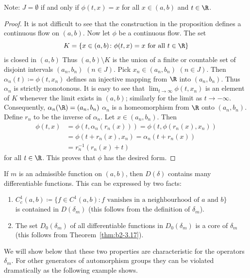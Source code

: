 Note: $J = \emptyset$ if and only if\/ $\phi(t,x) = x$ for all $x \in (a,b)$ and $t \in \R$.
\begin{proof}
It is not difficult to see that the construction in the proposition defines a continuous flow on $(a,b)$.
Now let $\phi$ be a continuous flow.
The set 
\[
K = \{ x \in (a,b) \colon \phi(t,x) = x \text{ for all } t \in \R \} 
\]
is closed in $(a,b)$
Thus $(a,b) \setminus K$ is the union of a finite or countable set of disjoint intervals $(a_{n},b_{n})$ $(n \in J)$.
Pick $x_{n} \in (a_{n},b_{n})$ $(n \in J)$.
Then $\alpha_{n}(t) \coloneq \phi(t,x_{n})$ defines an injective mapping from $\R$ into $(a_{n},b_{n})$.
Thus $\alpha_{n}$ is strictly monotonous.
It is easy to see that $\lim_{t \to \infty} \phi(t,x_{n})$ is an element of\/ $K$ whenever the limit exists in $(a,b)$; similarly for the limit as $t \to -\infty$.
Consequently, $\alpha_{n}(\R) = (a_{n},b_{n})$ \ie  $\alpha_{n}$ is a homeomorphism from $\R$ onto $(a_{n},b_{n})$.
Define $r_{n}$ to be the inverse of\/ $\alpha_{n}$.
Let $x \in (a_{n},b_{n})$.
Then 
\begin{align*}
\phi(t,x) &= \phi(t, \alpha_{n}(r_{n}(x))) = \phi(t, \phi(r_{n}(x),x_{n})) \\
          &= \phi(t + r_{n}(x),x_{n}) = \alpha_{n}(t + r_{n}(x)) \\
          &= r_{n}^{-1}(r_{n}(x) + t)	
\end{align*}
for all $t \in \R$.
This proves that $\phi$ has the desired form.
\end{proof}
If\/ $m$ is an admissible function on $(a,b)$, then $D(\delta)$ contains many differentiable functions.
This can be expressed by two facts:
\begin{enumerate}[\upshape (i)]
\item \label{enum:b2-3-1.1}
$C_{c}^{1}(a,b) \coloneq \{ f \in C^{1}(a,b) \colon f \text{ vanishes in a neighbourhood of } a \text{ and } b\}$
\\is contained in $D(\delta_{m})$ (this follows from the definition of\/ $\delta_{m}$).

\item  \label{enum:b2-3-1.2}
The set $D_{0}(\delta_{m})$ of all differentiable functions in $D_{0}(\delta_{m})$ is a core of\/ $\delta_{m}$\\ (this follows from Theorem~\ref{thm:b2-3.17}).
\end{enumerate}
We will show below that these two properties are characteristic for the operators $\delta_{m}$.
For other generators of automorphism groups they can be violated dramatically as the following example shows.
